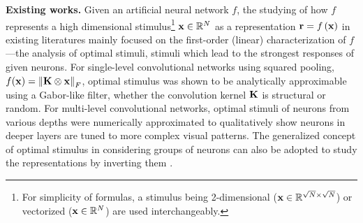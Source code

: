 \documentclass[10pt,twocolumn,letterpaper]{article}
\begin{document}

\newcommand{\expstimdim}{For simplicity of formulas, a stimulus being 2-dimensional (\ie ${\bf{x}} \in \mathbb{R}^{\sqrt{N} \times \sqrt{N}}$) or vectorized (\ie ${\bf{x}} \in \mathbb{R}^N$) are used interchangeably.}

{\bf Existing works.} 
Given an artificial neural network $f$, the studying of how $f$ represents a high dimensional stimulus\footnote{\expstimdim} ${\bf{x}} \in \mathbb{R}^N$ as a representation 
${\bf{r}} = f\left( {\bf{x}} \right)$ in existing literatures mainly focused on the first-order (\ie linear) characterization of $f$---the analysis of optimal stimuli, stimuli which lead to the strongest responses of given neurons.
For single-level convolutional networks using squared pooling, \ie $f({\bf{x}}) = \left\| {\bf{K}} \otimes {\bf{x}} \right\|_{F}$, optimal stimulus was shown to be analytically approximable \cite{saxe2011random} using a Gabor-like filter, whether the convolution kernel $\bf{K}$ is structural or random.
For multi-level convolutional networks, optimal stimuli of neurons from various depths were numerically approximated \cite{ngiam2010tiled, le2012building, zeiler2014visualizing, simonyan2013deep} to qualitatively show neurons in deeper layers are tuned to more complex visual patterns.
The generalized concept of optimal stimulus in considering groups of neurons can also be adopted to study the representations by inverting them \cite{mahendran2014understanding}.
\end{document}
